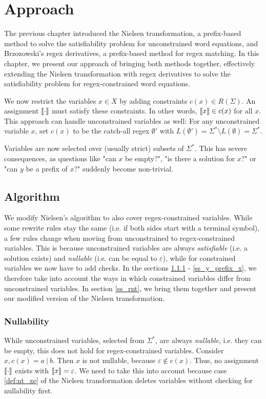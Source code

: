 \chapter{Approach} \label{ch_approach}
The previous chapter introduced the Nielsen transformation, a prefix-based method to solve the satisfiability problem for unconstrained word equations, and Brzozowski's regex derivatives, a prefix-based method for regex matching. In this chapter, we present our approach of bringing both methods together, effectively extending the Nielsen transformation with regex derivatives to solve the satisfiability problem for regex-constrained word equations.

We now restrict the variables $x \in X$ by adding constraints $c(x) \in R(\Sigma)$.
An assignment $\llbracket \cdot \rrbracket$ must satisfy these constraints. In other words, $\llbracket x \rrbracket \in c(x)$ for all $x$.
This approach can handle unconstrained variables as well: For any unconstrained variable $x$, set $c(x)$ to be the catch-all regex $\emptyset'$ with $L(\emptyset') = \Sigma^* \setminus L(\emptyset) = \Sigma^*$.

Variables are now selected over (usually strict) subsets of $\Sigma^*$. This has severe consequences, as questions like "can $x$ be empty?", "is there a solution for $x$?" or "can $y$ be a prefix of $x$?" suddenly become non-trivial.

\section{Algorithm} \label{s_algorithm}
We modify Nielsen's algorithm to also cover regex-constrained variables. While some rewrite rules stay the same (i.e. if both sides start with a terminal symbol), a few rules change when moving from unconstrained to regex-constrained variables. This is because unconstrained variables are always \textit{satisfiable} (i.e. a solution exists) and \textit{nullable} (i.e. can be equal to $\varepsilon$), while for constrained variables we now have to add checks. In the sections \ref{ss_nullability} - \ref{ss_y_prefix_x}, we therefore take into account the ways in which constrained variables differ from unconstrained variables. In section \ref{ss_rnt}, we bring them together and present our modified version of the Nielsen transformation.

\subsection{Nullability} \label{ss_nullability}
While unconstrained variables, selected from $\Sigma^*$, are always \textit{nullable}, i.e. they can be empty, this does not hold for regex-constrained variables. 
Consider $x, c(x) = a\:|\:b$. Then $x$ is not nullable, because $\varepsilon \not\in c(x)$. Thus, no assignment $\llbracket \cdot \rrbracket$ exists with $\llbracket x \rrbracket = \varepsilon$. We need to take this into account because case \ref{def:nt_xe} of the Nielsen transformation deletes variables without checking for nullability first.


